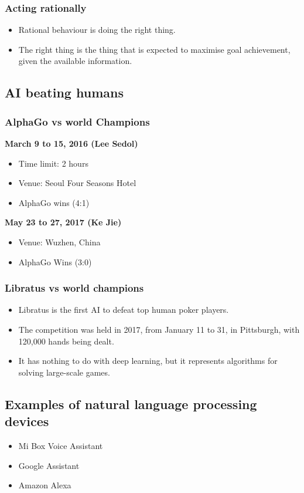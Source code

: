 \documentclass[11pt]{article}
\begin{document}
\subsubsection{Acting rationally}
\label{sec:orgcfa41de}
\begin{itemize}
\item Rational behaviour is doing the right thing.
\item The right thing is the thing that is expected to maximise goal achievement, given the available information.
\end{itemize}
\subsection{AI beating humans}
\label{sec:orgbe37b86}

\subsubsection{AlphaGo vs world Champions}
\label{sec:orgc6d769b}
\textbf{March 9 to 15, 2016 (Lee Sedol)}
\begin{itemize}
\item Time limit: 2 hours
\item Venue: Seoul Four Seasons Hotel
\item AlphaGo wins (4:1)
\end{itemize}

\textbf{May 23 to 27, 2017 (Ke Jie)}
\begin{itemize}
\item Venue: Wuzhen, China
\item AlphaGo Wins (3:0)
\end{itemize}
\subsubsection{Libratus vs world champions}
\label{sec:orga91803c}
\begin{itemize}
\item Libratus is the first AI to defeat top human poker players.
\item The competition was held in 2017, from January 11 to 31, in Pittsburgh, with 120,000 hands being dealt.
\item It has nothing to do with deep learning, but it represents algorithms for solving large-scale games.
\end{itemize}
\subsection{Examples of natural language processing devices}
\label{sec:orgc6cade5}
\begin{itemize}
\item Mi Box Voice Assistant
\item Google Assistant
\item Amazon Alexa
\end{itemize}
\end{document}
